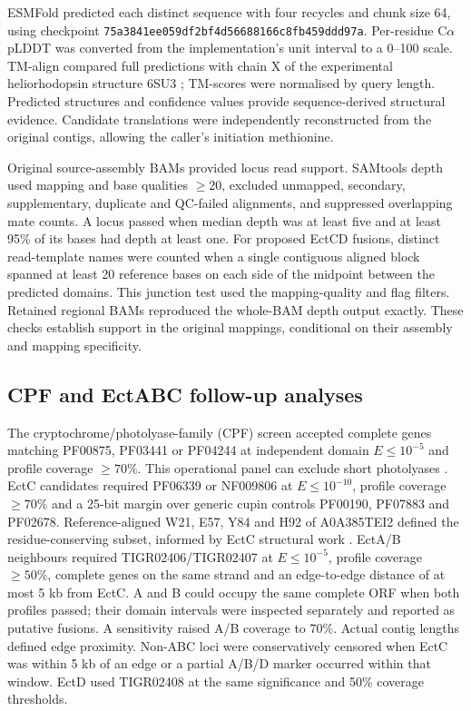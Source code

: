ESMFold \citep{lin2023esmfold} predicted each distinct sequence with four recycles and chunk size 64, using checkpoint \texttt{75a3841ee059df2bf4d56688166c8fb459ddd97a}. Per-residue C$\alpha$ pLDDT was converted from the implementation's unit interval to a 0--100 scale. TM-align \citep{zhang2005tmalign} compared full predictions with chain X of the experimental heliorhodopsin structure 6SU3 \citep{kovalev2020heliorhodopsin}; TM-scores were normalised by query length. Predicted structures and confidence values provide sequence-derived structural evidence. Candidate translations were independently reconstructed from the original contigs, allowing the caller's initiation methionine.

Original source-assembly BAMs provided locus read support. SAMtools depth used mapping and base qualities $\geq20$, excluded unmapped, secondary, supplementary, duplicate and QC-failed alignments, and suppressed overlapping mate counts. A locus passed when median depth was at least five and at least 95\% of its bases had depth at least one. For proposed EctCD fusions, distinct read-template names were counted when a single contiguous aligned block spanned at least 20 reference bases on each side of the midpoint between the predicted domains. This junction test used the mapping-quality and flag filters. Retained regional BAMs reproduced the whole-BAM depth output exactly. These checks establish support in the original mappings, conditional on their assembly and mapping specificity.

\subsection*{CPF and EctABC follow-up analyses}
The cryptochrome/photolyase-family (CPF) screen accepted complete genes matching PF00875, PF03441 or PF04244 at independent domain $E\leq10^{-5}$ and profile coverage $\geq70\%$. This operational panel can exclude short photolyases \citep{xu2021shortphotolyases}. EctC candidates required PF06339 or NF009806 at $E\leq10^{-10}$, profile coverage $\geq70\%$ and a 25-bit margin over generic cupin controls PF00190, PF07883 and PF02678. Reference-aligned W21, E57, Y84 and H92 of A0A385TEI2 defined the residue-conserving subset, informed by EctC structural work \citep{czech2019ectc}. EctA/B neighbours required TIGR02406/TIGR02407 at $E\leq10^{-5}$, profile coverage $\geq50\%$, complete genes on the same strand and an edge-to-edge distance of at most 5 kb from EctC. A and B could occupy the same complete ORF when both profiles passed; their domain intervals were inspected separately and reported as putative fusions. A sensitivity raised A/B coverage to 70\%. Actual contig lengths defined edge proximity. Non-ABC loci were conservatively censored when EctC was within 5 kb of an edge or a partial A/B/D marker occurred within that window. EctD used TIGR02408 at the same significance and 50\% coverage thresholds.

